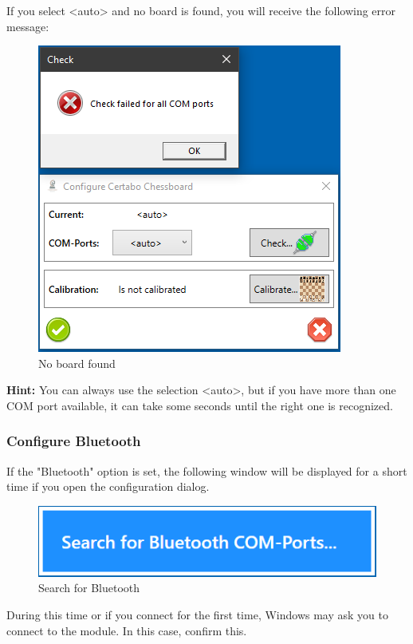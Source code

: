 \documentclass[11pt,a4paper]{article}
\begin{document}
If you select <auto> and no board is found, you will receive the following error message:

\begin{figure}[H]
	\centering
	\includegraphics[scale=0.9]{Calibrate3.png}
	\caption{No board found }
	\label{fig:Calibrate3}
\end{figure}

\textbf{Hint:} You can always use the selection <auto>, but if you have more than one COM port available, it can take some seconds until the right one is recognized.


\subsubsection{Configure Bluetooth} \label{CertaboBluetooth}

If the "Bluetooth" option is set, the following window will be displayed for a short time if you open the configuration dialog.

\begin{figure}[H]
	\centering
	\includegraphics[scale=0.8]{MillenniumChessLink10.png}
	\caption{Search for Bluetooth}
	\label{fig:CertaboBT10}
\end{figure}

During this time or if you connect for the first time, Windows may ask you to connect to the module. In this case, confirm this. 
\end{document}
